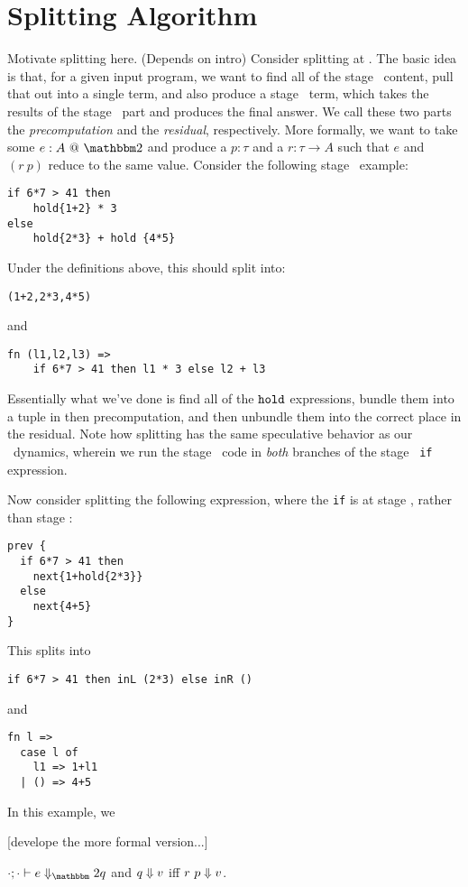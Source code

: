
\section{Splitting Algorithm}

Motivate splitting here.  (Depends on intro)
Consider splitting at \bbtwo. 
The basic idea is that, for a given input program, we want to find all of the stage \bbone\ content, pull that out into a single term, 
and also produce a stage \bbtwo\ term, which takes the results of the stage \bbone\ part and produces the final answer.
We call these two parts the {\em precomputation} and the {\em residual}, respectively.
More formally, we want to take some $\coltwo e A$ and produce a $p : \tau$ and a $r : \tau \to A$ such that $e$ and $(r~p)$ reduce to the same value.
Consider the following stage \bbtwo\ example:
\begin{lstlisting}
if 6*7 > 41 then
	hold{1+2} * 3
else 
	hold{2*3} + hold {4*5}
\end{lstlisting}
Under the definitions above, this should split into:
\begin{lstlisting}
(1+2,2*3,4*5)
\end{lstlisting}
and
\begin{lstlisting}
fn (l1,l2,l3) => 
    if 6*7 > 41 then l1 * 3 else l2 + l3
\end{lstlisting}
Essentially what we've done is find all of the ${\tt hold}$ expressions, 
bundle them into a tuple in then precomputation, 
and then unbundle them into the correct place in the residual.
Note how splitting has the same speculative behavior as our \lang\ dynamics,
wherein we run the stage \bbone\ code in {\em both} branches of the stage \bbtwo\ {\tt if} expression.

Now consider splitting the following expression, where the {\tt if} is at stage \bbone, rather than stage \bbtwo:
\begin{lstlisting}
prev {
  if 6*7 > 41 then
    next{1+hold{2*3}}
  else 
    next{4+5}
}
\end{lstlisting}
This splits into
\begin{lstlisting}
if 6*7 > 41 then inL (2*3) else inR ()
\end{lstlisting}
and
\begin{lstlisting}
fn l => 
  case l of
    l1 => 1+l1
  | () => 4+5
\end{lstlisting}
In this example, we 

[develope the more formal version...]

  $\diatwo [\cdot;\cdot] e q$ and ${q} \Downarrow {v}$ iff ${r~p} \Downarrow {v}$.


